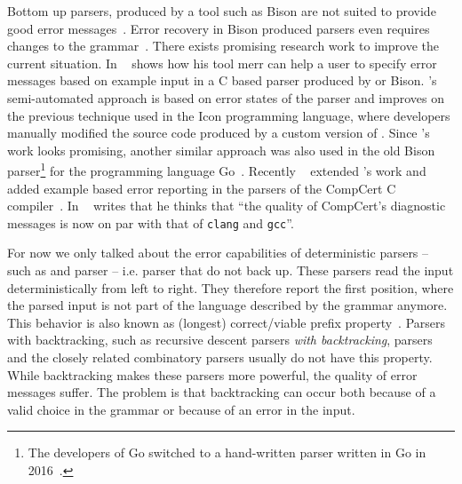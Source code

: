 Bottom up parsers, produced by a tool such as Bison are not suited to provide good error messages~\cite{jeffery2003generating}. Error recovery in Bison produced parsers even requires changes to the grammar~\cite{donnelly2019bison}. There exists promising research work to improve the current situation. In ~\cite{jeffery2003generating}  \citeauthor{jeffery2003generating} shows how his tool merr can help a user to specify error messages based on example input in a C based parser produced by  or Bison. \citeauthor{jeffery2003generating}’s semi-automated approach is based on error states of the parser and improves on the previous technique used in the Icon programming language, where developers manually modified the source code produced by a custom version of . Since  \citeauthor{jeffery2003generating}’s work looks promising, another similar approach was also used in the old Bison parser\footnote{The developers of Go switched to a hand-written parser written in Go in 2016~\cite{pike2017reddit, go2016release}.} for the programming language Go~\cite{cox2010errors}. Recently \citeauthor{pottier2016reachability}~\cite{pottier2016reachability} extended \citeauthor{jeffery2003generating}’s work and added example based error reporting in the  parsers of the CompCert C compiler~\cite{kaestner2018compcert}. In  \citeauthor{pottier2016reachability}~\cite{pottier2016reachability} writes that he thinks that “the quality of CompCert’s diagnostic messages is now on par with that of \texttt{clang} and \texttt{gcc}”.

For now we only talked about the error capabilities of deterministic parsers – such as  and  parser – i.e. parser that do not back up. These parsers read the input deterministically from left to right. They therefore report the first position, where the parsed input is not part of the language described by the grammar anymore. This behavior is also known as (longest) correct/viable prefix property~\cite{sippu1990parsing, ruefenacht2016error, maidl2016labeled, pottier2016reachability}. Parsers with backtracking, such as recursive descent parsers \emph{with backtracking},  parsers and the closely related combinatory parsers usually do not have this property. While backtracking makes these parsers more powerful, the quality of error messages suffer. The problem is that backtracking can occur both because of a valid choice in the grammar or because of an error in the input.

